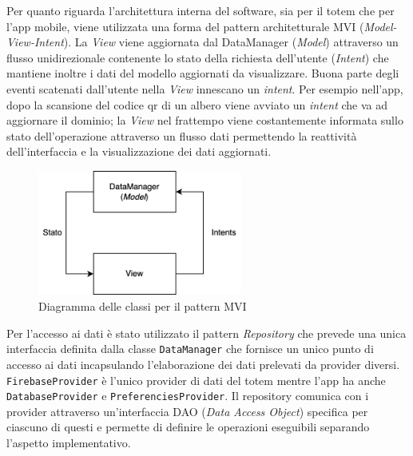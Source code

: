 
Per quanto riguarda l'architettura interna del software, sia per il totem che per l'app mobile, viene utilizzata una forma del pattern architetturale MVI (\textit{Model-View-Intent}). La \textit{View} viene aggiornata dal DataManager (\textit{Model}) attraverso un flusso unidirezionale contenente lo stato della richiesta dell'utente (\textit{Intent}) che mantiene inoltre i dati del modello aggiornati da visualizzare.
Buona parte degli eventi scatenati dall'utente nella \textit{View} innescano un \textit{intent}.
Per esempio nell'app, dopo la scansione del codice qr di un albero viene avviato un \textit{intent} che va ad aggiornare il dominio; la \textit{View} nel frattempo viene costantemente informata sullo stato dell'operazione attraverso un flusso dati permettendo la reattività dell'interfaccia e la visualizzazione dei dati aggiornati.
\begin{figure}
    \centering
    \includegraphics[width=0.6\textwidth]{img/totem/mvi-schema.png}
    \caption{Diagramma delle classi per il pattern MVI}
    \label{fig:mviPattern}
\end{figure}

Per l'accesso ai dati è stato utilizzato il pattern \textit{Repository} che prevede una unica interfaccia definita dalla classe \texttt{DataManager} che fornisce un unico punto di accesso ai dati incapsulando l'elaborazione dei dati prelevati da provider diversi.
\texttt{FirebaseProvider} è l'unico provider di dati del totem mentre l'app ha anche \texttt{DatabaseProvider} e \texttt{PreferenciesProvider}.
Il repository comunica con i provider attraverso un'interfaccia DAO (\textit{Data Access Object}) specifica per ciascuno di questi e permette di definire le operazioni eseguibili separando l'aspetto implementativo.

